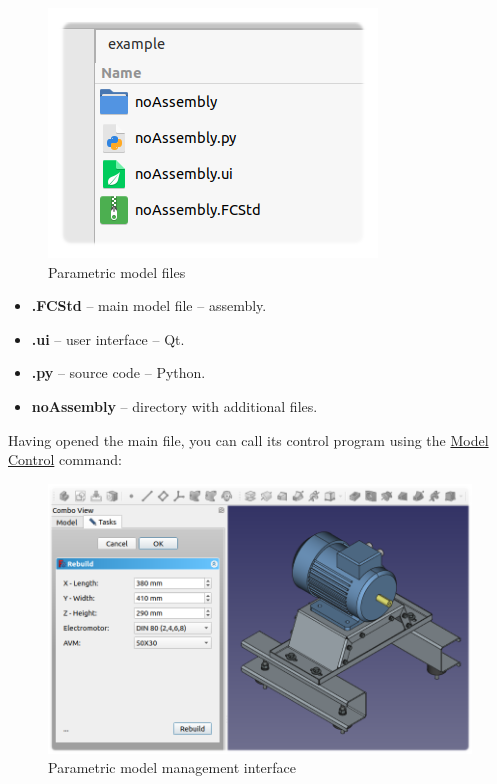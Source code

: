 \documentclass[a4paper,12pt]{article}
\begin{document}
\begin{figure}[htp]
	\centering
	\includegraphics[scale=1]{img/example.png}
	\caption{Parametric model files}
	\label{sec:example}
\end{figure}

\begin{itemize}
	\item \textbf{.FCStd} -- main model file -- assembly.
	\item \textbf{.ui} -- user interface -- Qt.
	\item \textbf{.py} -- source code -- Python.
	\item \textbf{noAssembly} -- directory with additional files.
\end{itemize}

\pagebreak

Having opened the main file, you can call its control program using the \hyperref[sec:3]{Model Control} command:

\begin{figure}[htp]
	\centering
	\includegraphics[width=1\textwidth]{img/example_mc.png}
	\caption{Parametric model management interface}
	\label{sec:example_mc}
\end{figure}
\end{document}
